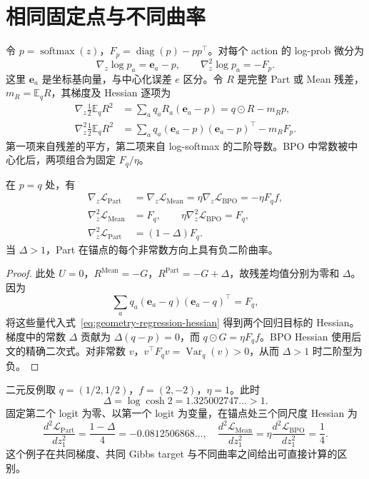 \documentclass[lang=cn,scheme=chinese,openany]{../book/elegantbook}
\newcommand{\E}{\mathbb E}
\newcommand{\Var}{\operatorname{Var}}
\begin{document}
\section{相同固定点与不同曲率}
\label{sec:geometry-curvature}
令 $p=\operatorname{softmax}(z)$，$F_p=\operatorname{diag}(p)-pp^\top$。对每个 action 的 log-prob 微分为
\begin{equation}
\nabla_z\log p_a=\mathbf e_a-p,\qquad
\nabla_z^2\log p_a=-F_p.
\end{equation}
这里 $\mathbf e_a$ 是坐标基向量，与中心化误差 $e$ 区分。令 $R$ 是完整 Part 或 Mean 残差，$m_R=\E_qR$，其梯度及 Hessian 逐项为
\begin{align}
\nabla_z\tfrac12\E_qR^2
&=\sum_a q_aR_a(\mathbf e_a-p)=q\odot R-m_Rp,\\
\nabla_z^2\tfrac12\E_qR^2
&=\sum_a q_a(\mathbf e_a-p)(\mathbf e_a-p)^\top-m_RF_p.
\label{eq:geometry-regression-hessian}
\end{align}
第一项来自残差的平方，第二项来自 log-softmax 的二阶导数。BPO 中常数被中心化后，两项组合为固定 $F_q/\eta$。

\begin{proposition}[锚点处的梯度与曲率]
\label{prop:geometry-anchor}
在 $p=q$ 处，有
\begin{align}
\nabla_z\mathcal L_{\mathrm{Part}}
&=\nabla_z\mathcal L_{\mathrm{Mean}}
=\eta\nabla_z\mathcal L_{\mathrm{BPO}}=-\eta F_qf,\\
\nabla_z^2\mathcal L_{\mathrm{Mean}}&=F_q,\qquad
\eta\nabla_z^2\mathcal L_{\mathrm{BPO}}=F_q,\\
\nabla_z^2\mathcal L_{\mathrm{Part}}&=(1-\Delta)F_q.
\end{align}
当 $\Delta>1$，Part 在锚点的每个非常数方向上具有负二阶曲率。
\end{proposition}
\begin{proof}
此处 $U=0$，$R^{\mathrm{Mean}}=-G$，$R^{\mathrm{Part}}=-G+\Delta$，故残差均值分别为零和 $\Delta$。因为
\begin{equation}
\sum_aq_a(\mathbf e_a-q)(\mathbf e_a-q)^\top=F_q,
\end{equation}
将这些量代入式~\eqref{eq:geometry-regression-hessian} 得到两个回归目标的 Hessian。梯度中的常数 $\Delta$ 贡献为 $\Delta(q-p)=0$，而 $q\odot G=\eta F_qf$。BPO Hessian 使用后文的精确二次式。对非常数 $v$，$v^\top F_qv=\Var_q(v)>0$，从而 $\Delta>1$ 时二阶型为负。
\end{proof}

二元反例取 $q=(1/2,1/2)$，$f=(2,-2)$，$\eta=1$。此时
\begin{equation}
\Delta=\log\cosh2=1.325002747\ldots>1.
\end{equation}
固定第二个 logit 为零、以第一个 logit 为变量，在锚点处三个同尺度 Hessian 为
\begin{equation}
\frac{d^2\mathcal L_{\mathrm{Part}}}{dz_1^2}
=\frac{1-\Delta}{4}=-0.0812506868\ldots,
\quad \frac{d^2\mathcal L_{\mathrm{Mean}}}{dz_1^2}
=\eta\frac{d^2\mathcal L_{\mathrm{BPO}}}{dz_1^2}=\frac14.
\end{equation}
这个例子在共同梯度、共同 Gibbs target 与不同曲率之间给出可直接计算的区别。
\end{document}
